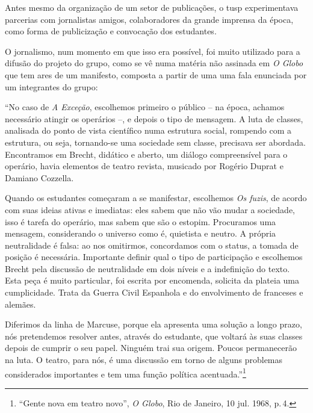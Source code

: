 
Antes mesmo da organização de um setor de publicações, o {\sc tusp}
experimentava parcerias com jornalistas amigos, colaboradores da grande
imprensa da época, como forma de publicização e convocação dos
estudantes.

O jornalismo, num momento em que isso era possível, foi muito utilizado
para a difusão do projeto do grupo, como se vê numa matéria não assinada
em {\it O Globo} que tem ares de um manifesto, composta a partir de uma
uma fala enunciada por um integrantes do grupo:

\startblockquote
“No caso de {\it A Exceção}, escolhemos primeiro o público -- na época,
achamos necessário atingir os operários --, e depois o tipo de mensagem.
A luta de classes, analisada do ponto de vista científico numa estrutura
social, rompendo com a estrutura, ou seja, tornando-se uma sociedade sem
classe, precisava ser abordada. Encontramos em Brecht, didático e
aberto, um diálogo compreensível para o operário, havia elementos de
teatro revista, musicado por Rogério Duprat e Damiano Cozzella.

Quando os estudantes começaram a se manifestar, escolhemos {\it Os
fuzis}, de acordo com suas ideias ativas e imediatas: eles sabem que não
vão mudar a sociedade, isso é tarefa do operário, mas sabem que são o
estopim. Procuramos uma mensagem, considerando o universo como é,
quietista e neutro. A própria neutralidade é falsa: ao nos omitirmos,
concordamos com o status, a tomada de posição é necessária. Importante
definir qual o tipo de participação e escolhemos Brecht pela discussão
de neutralidade em dois níveis e a indefinição do texto. Esta peça é
muito particular, foi escrita por encomenda, solicita da plateia uma
cumplicidade. Trata da Guerra Civil Espanhola e do envolvimento de
franceses e alemães.

Diferimos da linha de Marcuse, porque ela apresenta uma solução a longo
prazo, nós pretendemos resolver antes, através do estudante, que voltará
às suas classes depois de cumprir o seu papel. Ninguém trai sua origem.
Poucos permanecerão na luta. O teatro, para nós, é uma discussão em
torno de alguns problemas considerados importantes e tem uma função
política acentuada.”\footnote{“Gente nova em teatro novo”, {\it O
  Globo}, Rio de Janeiro, 10 jul. 1968, p.\,4.}
\stopblockquote

